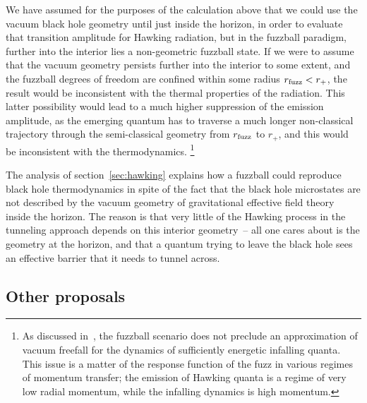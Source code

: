 \documentclass[11pt]{article}
\newcommand{\rcite}{\cite}
\numberwithin{equation}{section}
\begin{document}
We have assumed for the purposes of the calculation above that we could use the vacuum black hole geometry until just inside the horizon, in order to evaluate that transition amplitude for Hawking radiation, but in the fuzzball paradigm, further into the interior lies a non-geometric fuzzball state.  If we were to assume that the vacuum geometry persists further into the interior to some extent, and the fuzzball degrees of freedom are confined within some radius $r_{\rm fuzz}<r_+$, the result would be inconsistent with the thermal properties of the radiation.  This latter possibility would lead to a much higher suppression of the emission amplitude, as the emerging quantum has to traverse a much longer non-classical trajectory through the semi-classical geometry from $r_{\rm fuzz}$ to $r_+$, and this would be inconsistent with the thermodynamics.%
\footnote{As discussed in~\rcite{Mathur:2012jk}, the fuzzball scenario does not preclude an approximation of vacuum freefall for the dynamics of sufficiently energetic infalling quanta.  This issue is a matter of the response function of the fuzz in various regimes of momentum transfer; the emission of Hawking quanta is a regime of very low radial momentum, while the infalling dynamics is high momentum.}





The analysis of section~\ref{sec:hawking} explains how a fuzzball could reproduce black hole thermodynamics in spite of the fact that the black hole microstates are not described by the vacuum geometry of gravitational effective field theory inside the horizon.  The reason is that very little of the Hawking process in the tunneling approach depends on this interior geometry~-- all one cares about is the geometry at the horizon, and that a quantum trying to leave the black hole sees an effective barrier that it needs to tunnel across.



\subsection{Other proposals}
\label{sec:others}
\end{document}
